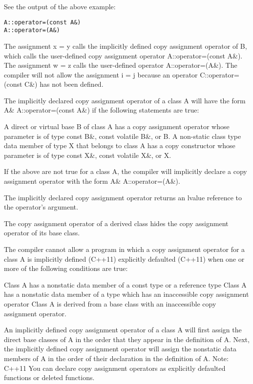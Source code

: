 \documentclass{book}
\begin{document}
See the output of the above example:

\begin{lstlisting}
A::operator=(const A&)
A::operator=(A&)
\end{lstlisting}

The assignment x = y calls the implicitly defined copy assignment operator of B, which calls the user-defined copy assignment operator A::operator=(const A\&).
The assignment w = z calls the user-defined operator A::operator=(A\&). The compiler will not allow the assignment i = j because an operator C::operator=(const C\&) has not been defined.

The implicitly declared copy assignment operator of a class A will have the form A\& A::operator=(const A\&) if the following statements are true:

    A direct or virtual base B of class A has a copy assignment operator whose parameter is of type const B\&, const volatile B\&, or B.
    A non-static class type data member of type X that belongs to class A has a copy constructor whose parameter is of type const X\&, const volatile X\&, or X.

If the above are not true for a class A, the compiler will implicitly declare a copy assignment operator with the form A\& A::operator=(A\&).

The implicitly declared copy assignment operator returns an lvalue reference to the operator's argument.

The copy assignment operator of a derived class hides the copy assignment operator of its base class.

The compiler cannot allow a program in which a copy assignment operator for a class A is implicitly defined (C++11)  explicitly defaulted (C++11) when one or more of the following conditions are true:

    Class A has a nonstatic data member of a const type or a reference type
    Class A has a nonstatic data member of a type which has an inaccessible copy assignment operator
    Class A is derived from a base class with an inaccessible copy assignment operator.

An implicitly defined copy assignment operator of a class A will first assign the direct base classes of A in the order that they appear in the definition of A. 
Next, the implicitly defined copy assignment operator will assign the nonstatic data members of A in the order of their declaration in the definition of A.
Note: C++11 You can declare copy assignment operators as explicitly defaulted functions or deleted functions. 
\end{document}
